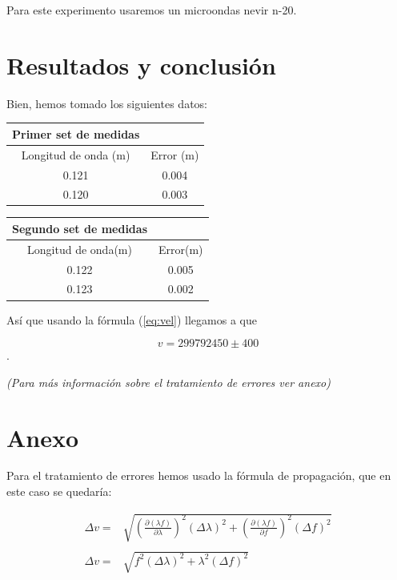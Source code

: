 \documentclass{article}
\begin{document}
Para este experimento usaremos un microondas nevir n-20.

\section{Resultados y conclusión}
Bien, hemos tomado los siguientes datos:  

\begin{minipage}{0.5\linewidth}
\begin{tabular}{c|c}
    \multicolumn{1}{c}{Primer set de medidas}&   \\ \hline
     Longitud de onda (m) & Error (m)\\ \hline
     0.121 & 0.004 \\ \hline
     0.120 & 0.003 \\ \hline
\end{tabular}
\end{minipage}
\begin{minipage}{0.5\linewidth}
\begin{tabular}{c|c}
    \multicolumn{1}{c}{Segundo set de medidas}&   \\ \hline
     Longitud de onda(m) & Error(m) \\ \hline 
     0.122 & 0.005 \\ \hline
     0.123 & 0.002 \\ \hline
\end{tabular}
\end{minipage}

Así que usando la fórmula (\ref{eq:vel}) llegamos a que 

$$v = 299792450 \pm 400$$.

\textit{(Para más información sobre el tratamiento de errores ver anexo)}

\section{Anexo}
Para el tratamiento de errores hemos usado la fórmula de propagación, que en este caso se quedaría:

\[\begin{array}{cc}
    \Delta v =& \sqrt{\left(\frac{\partial (\lambda f)}{\partial \lambda}\right)^2\left(\Delta\lambda\right)^2+ \left(\frac{\partial (\lambda f)}{\partial f}\right)^2 \left(\Delta f \right)^2}  \\ \\
    \Delta v =&  \sqrt{f^2(\Delta \lambda)^2 + \lambda^2 (\Delta f)^2}
\end{array}\]

\end{document}
